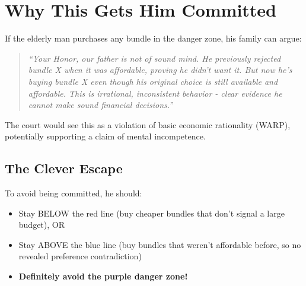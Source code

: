 \documentclass[11pt]{article}
\begin{document}
\section{Why This Gets Him Committed}

If the elderly man purchases any bundle in the danger zone, his family can argue:

\begin{quote}
\textit{``Your Honor, our father is not of sound mind. He previously rejected bundle X when it was affordable, proving he didn't want it. But now he's buying bundle X even though his original choice is still available and affordable. This is irrational, inconsistent behavior - clear evidence he cannot make sound financial decisions.''}
\end{quote}

The court would see this as a violation of basic economic rationality (WARP), potentially supporting a claim of mental incompetence.

\subsection{The Clever Escape}

To avoid being committed, he should:
\begin{itemize}
\item Stay BELOW the red line (buy cheaper bundles that don't signal a large budget), OR
\item Stay ABOVE the blue line (buy bundles that weren't affordable before, so no revealed preference contradiction)
\item \textbf{Definitely avoid the purple danger zone!}
\end{itemize}
\end{document}
